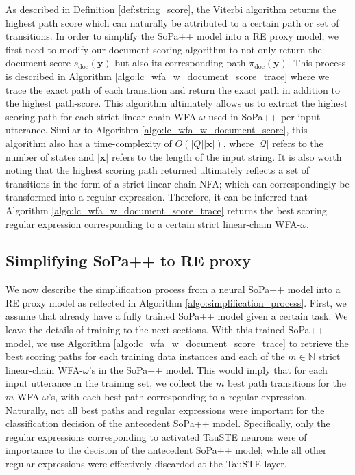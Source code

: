 As described in Definition \ref{def:string_score}, the Viterbi algorithm returns
the highest path score which can naturally be attributed to a certain path or
set of transitions. In order to simplify the SoPa++ model into a RE proxy model,
we first need to modify our document scoring algorithm to not only return the
document score $s_{\text{doc}}(\bm{y})$ but also its corresponding path
$\pi_{\text{doc}}(\bm{y})$. This process is described in Algorithm
\ref{algo:lc_wfa_w_document_score_trace} where we trace the exact path of each
transition and return the exact path in addition to the highest path-score. This
algorithm ultimately allows us to extract the highest scoring path for each
strict linear-chain WFA-$\omega$ used in SoPa++ per input utterance. Similar to
Algorithm \ref{algo:lc_wfa_w_document_score}, this algorithm also has a
time-complexity of $O(|Q||\bm{x}|)$, where $|\mathcal{Q}|$ refers to the number
of states and $|\bm{x}|$ refers to the length of the input string. It is also
worth noting that the highest scoring path returned ultimately reflects a set of
transitions in the form of a strict linear-chain NFA; which can correspondingly
be transformed into a regular expression. Therefore, it can be inferred that
Algorithm \ref{algo:lc_wfa_w_document_score_trace} returns the best scoring
regular expression corresponding to a certain strict linear-chain WFA-$\omega$.

\subsection{Simplifying SoPa++ to RE proxy}

We now describe the simplification process from a neural SoPa++ model into a RE
proxy model as reflected in Algorithm \ref{algo:simplification_process}. First,
we assume that already have a fully trained SoPa++ model given a certain task.
We leave the details of training to the next sections. With this trained SoPa++
model, we use Algorithm \ref{algo:lc_wfa_w_document_score_trace} to retrieve the
best scoring paths for each training data instances and each of the $m \in
\mathbb{N}$ strict linear-chain WFA-$\omega$'s in the SoPa++ model. This would
imply that for each input utterance in the training set, we collect the $m$ best
path transitions for the $m$ WFA-$\omega$'s, with each best path corresponding
to a regular expression. Naturally, not all best paths and regular expressions
were important for the classification decision of the antecedent SoPa++ model.
Specifically, only the regular expressions corresponding to activated TauSTE
neurons were of importance to the decision of the antecedent SoPa++ model; while
all other regular expressions were effectively discarded at the TauSTE layer.

